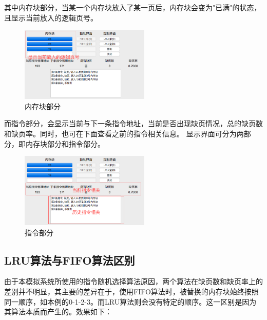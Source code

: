 \documentclass{article}
\begin{document}
\begin{CJK}{UTF8}{gbsn}
其中内存块部分，当某一个内存块放入了某一页后，内存块会变为"已满"的状态，且显示当前放入的逻辑页号。
\begin{figure}[!h]
\centering
\includegraphics[width=0.55\textwidth]{6.png}
\caption{内存块部分}
\end{figure}

而指令部分，会显示当前与下一条指令地址，当前是否出现缺页情况，总的缺页数和缺页率。同时，也可在下面查看之前的指令相关信息。
显示界面可分为两部分，即内存块部分和指令部分。
\begin{figure}[!h]
\centering
\includegraphics[width=0.55\textwidth]{7.png}
\caption{指令部分}
\end{figure}

\clearpage
\subsection{LRU算法与FIFO算法区别}
由于本模拟系统所使用的指令随机选择算法原因，两个算法在缺页数和缺页率上的差别并不明显，其主要的差异在于，使用FIFO算法时，被替换的内存块始终按照同一顺序，如本例的0-1-2-3。而LRU算法则会没有特定的顺序。这一区别是因为其算法本质而产生的。效果如下：
\begin{figure}[!h]
  \hspace{0.5in}
   

\end{figure}
\end{CJK}
\end{document}
